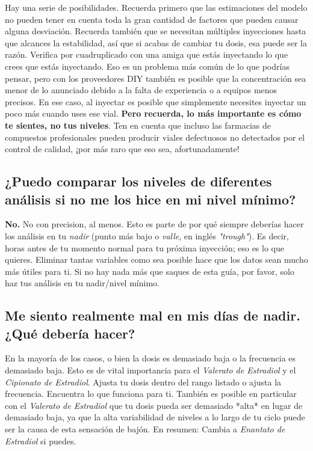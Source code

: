 \documentclass{article}
\begin{document}
Hay una serie de posibilidades. Recuerda primero que las estimaciones del modelo no pueden tener en cuenta toda la gran cantidad de factores que pueden causar alguna desviación. Recuerda también que se necesitan múltiples inyecciones hasta que alcances la estabilidad, así que si acabas de cambiar tu dosis, esa puede ser la razón. Verifica por cuadruplicado con una amiga que estás inyectando lo que crees que estás inyectando. Eso es un problema más común de lo que podrías pensar, pero con los proveedores DIY también es posible que la concentración sea menor de lo anunciado debido a la falta de experiencia o a equipos menos precisos. En ese caso, al inyectar es posible que simplemente necesites inyectar un poco más cuando uses ese vial. \textbf{Pero recuerda, lo más importante es cómo te sientes, no tus niveles}. Ten en cuenta que incluso las farmacias de compuestos profesionales pueden producir viales defectuosos no detectados por el control de calidad, ¡por más raro que eso sea, afortunadamente!

\subsection{¿Puedo comparar los niveles de diferentes análisis si no me los hice en mi nivel mínimo?}

\textbf{No.} No con precision, al menos. Esto es parte de por qué siempre deberías hacer los análisis en tu \textit{nadir} (punto más bajo o \textit{valle}, en inglés \textit{"trough"}). Es decir, horas antes de tu momento normal para tu próxima inyección; eso es lo que quieres. Eliminar tantas variables como sea posible hace que los datos sean mucho más útiles para ti. Si no hay nada más que saques de esta guía, por favor, solo haz tus análisis en tu nadir/nivel mínimo.

\subsection{Me siento realmente mal en mis días de nadir. ¿Qué debería hacer?}\label{7-3}

En la mayoría de los casos, o bien la dosis es demasiado baja o la frecuencia es demasiado baja. Esto es de vital importancia para el \textit{Valerato de Estradiol} y el \textit{Cipionato de Estradiol}. Ajusta tu dosis dentro del rango listado o ajusta la frecuencia. Encuentra lo que funciona para ti. También es posible en particular con el \textit{Valerato de Estradiol} que tu dosis pueda ser demasiado *alta* en lugar de demasiado baja, ya que la alta variabilidad de niveles a lo largo de tu ciclo puede ser la causa de esta sensación de bajón. En resumen: Cambia a \textit{Enantato de Estradiol} si puedes.
\end{document}
